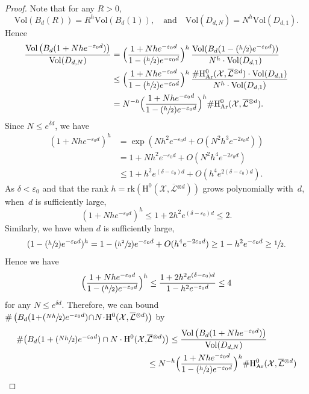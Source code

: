 \documentclass[11pt]{article}
\numberwithin{equation}{section}
\newcommand{\Psfrac}[2]{(\sfrac{#1}{#2})}
\theoremstyle{plain}
\theoremstyle{definition}
\newcommand{\ho}{\mathrm{H}}
\newcommand{\X}{\mathcal{X}}
\newcommand{\Li}{\overline{\mathcal{L}}{}}
\begin{document}
\begin{proof}[Proof]
Note that for any $R>0$,
\[
\mathrm{Vol}\left(B_d(R)\right)=R^h\mathrm{Vol}\left(B_d(1)\right),
\quad\text{and}\quad
\mathrm{Vol}(D_{d,N})=N^{h} \mathrm{Vol}(D_{d,1}).
\]
Hence
\begin{align*}
\frac{\mathrm{Vol} \left(B_d(1+Nhe^{-\varepsilon_0 d}) \right)}{\mathrm{Vol}(D_{d,N})}
&=\Bigl(\frac{1+Nhe^{-\varepsilon_0 d}}{1-\Psfrac{h}{2}e^{-\varepsilon_0 d}}\Bigr)^h\,\frac{\mathrm{Vol}(B_d(1-\Psfrac{h}{2}e^{-\varepsilon_0 d}))}{N^h\cdot\mathrm{Vol}(D_{d,1})} \\
&\leq\Bigl(\frac{1+Nhe^{-\varepsilon_0 d}}{1-\Psfrac{h}{2}e^{-\varepsilon_0 d}}\Bigr)^h\,\frac{\#\ho^0_{\mathrm{Ar}}(\X,\Li^{\otimes d})\cdot \mathrm{Vol}(D_{d,1})}{N^{h}\cdot\mathrm{Vol}(D_{d,1})}\\
&=N^{-h}\Bigl(\frac{1+Nhe^{-\varepsilon_0 d}}{1-\Psfrac{h}{2}e^{-\varepsilon_0 d}}\Bigr)^h\#\ho^0_{\mathrm{Ar}}(\X,\Li^{\otimes d}).
\end{align*}
Since $N\leq e^{\delta d}$, we have
\begin{align*}
(1+Nhe^{-\varepsilon_0 d})^h &=\exp\left(Nh^2e^{-\varepsilon_0 d}+ O(N^2h^3e^{-2\varepsilon_0 d})\right)\\
&= 1+Nh^2e^{-\varepsilon_0 d}+O(N^2h^4e^{-2\varepsilon_0 d}) \\
&\leq 1+h^2e^{(\delta-\varepsilon_0) d}+O(h^4e^{2(\delta-\varepsilon_0) d}).
\end{align*}
As $\delta<\varepsilon_0$ and that the rank $h=\mathrm{rk}(\ho^0(\X,\Li^{\otimes d}))$ grows polynomially with~$d$, when~$d$ is sufficiently large,
\[
(1+Nhe^{-\varepsilon_0 d})^h \leq 1+2h^2e^{(\delta-\varepsilon_0) d}\leq 2.
\]
Similarly, we have when $d$ is sufficiently large,
\[
(1-\Psfrac{h}{2}e^{-\varepsilon_0 d})^h =1-\Psfrac{h^2}{2}e^{-\varepsilon_0 d}+O(h^4e^{-2\varepsilon_0 d})\geq 1-h^2e^{-\varepsilon_0 d}\geq \sfrac{1}{2}.
\]
Hence we have
\[
\Bigl(\frac{1+Nhe^{-\varepsilon_0 d}}{1-\Psfrac{h}{2}e^{-\varepsilon_0 d}}\Bigr)^h \leq \frac{1+2h^2e^{(\delta-\varepsilon_0) d}}{1-h^2e^{-\varepsilon_0 d}}\leq 4
\]
for any $N\!\leq\! e^{\delta d}$. Therefore, we can bound $\# \left(B_d(1\!+\!\Psfrac{Nh}{2}e^{-\varepsilon_0 d})\!\cap\! N\!\cdot\! \ho^0(\X,\Li^{\otimes d}) \right)$ by
\begin{align*}
\# \bigl(B_d(1+\Psfrac{Nh}{2}e^{-\varepsilon_0 d}) \cap N\cdot \ho^0(\X,&\Li^{\otimes d}) \bigr)
\leq \frac{\mathrm{Vol} \left(B_d(1+Nhe^{-\varepsilon_0 d}) \right)}{\mathrm{Vol}(D_{d,N})} \\
&\leq N^{-h}\Bigl(\frac{1+Nhe^{-\varepsilon_0 d}}{1-\Psfrac{h}{2}e^{-\varepsilon_0 d}} \Bigr)^h\#\ho^0_{\mathrm{Ar}}(\X,\Li^{\otimes d})\\

\end{align*}
\end{proof}
\end{document}
